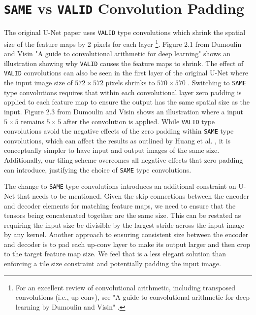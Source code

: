\documentclass[10pt, indentfirst]{article}
\begin{document}
\section{\texttt{SAME}  vs \texttt{VALID} Convolution Padding}

The original U-Net paper uses \texttt{VALID} type convolutions which shrink the spatial size of the feature maps by 2 pixels for each layer \cite{Dumoulin2018}\footnote{For an excellent review of convolutional arithmetic, including transposed convolutions (i.e., up-conv), see "A guide to convolutional arithmetic for deep learning by Dumoulin and Visin" \cite{Dumoulin2018}.}. 
Figure 2.1 from Dumoulin and Visin "A guide to convolutional arithmetic for deep learning" \cite{Dumoulin2018} shows an illustration showing why \texttt{VALID} causes the feature maps to shrink. The effect of \texttt{VALID} convolutions can also be seen in the first layer of the original U-Net where the input image size of $572 \times 572$ pixels shrinks to $570 \times 570$ \cite{Ronneberger2015a}. 
Switching to \texttt{SAME} type convolutions requires that within each convolutional layer zero padding is applied to each feature map to ensure the output has the same spatial size as the input. 
Figure 2.3 from Dumoulin and Visin \cite{Dumoulin2018} shows an illustration where a input $5 \times 5$ remains $5 \times 5$ after the convolution is applied. 
While \texttt{VALID} type convolutions avoid the negative effects of the zero padding within \texttt{SAME} type convolutions, which can affect the results as outlined by Huang et al. \cite{Huang2019a}, it is conceptually simpler to have input and output images of the same size. Additionally, our tiling scheme overcomes all negative effects that zero padding can introduce, justifying the choice of \texttt{SAME} type convolutions. 

The change to \texttt{SAME} type convolutions introduces an additional constraint on U-Net that needs to be mentioned. Given the skip connections between the encoder and decoder elements for matching feature maps, we need to ensure that the tensors being concatenated together are the same size. This can be restated as requiring the input size be divisible by the largest stride across the input image by any kernel. Another approach to ensuring consistent size between the encoder and decoder is to pad each up-conv layer to make its output larger and then crop to the target feature map size. We feel that is a less elegant solution than enforcing a tile size constraint and potentially padding the input image. 
\end{document}
